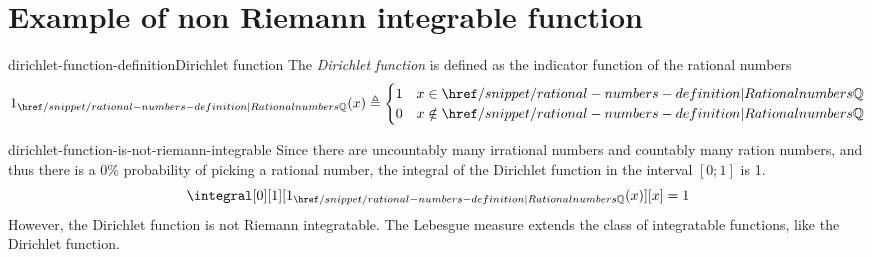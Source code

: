 \documentclass[preview]{standalone}
\begin{document}
\genpage


\section{Example of non Riemann integrable function}

\begin{snippetdefinition}{dirichlet-function-definition}{Dirichlet function}
    The \textit{Dirichlet function} is defined as the indicator function of the rational numbers
    \[
        1_{\rationalnumbers}(x) \triangleq \begin{cases}
            1 & x \in \rationalnumbers \\
            0 & x \notin \rationalnumbers
        \end{cases}
    \]
\end{snippetdefinition}

\begin{snippet}{dirichlet-function-is-not-riemann-integrable}
    Since there are uncountably many irrational numbers and countably many ration numbers,
    and thus there is a 0\% probability of picking a rational number, the integral
    of the Dirichlet function in the interval \([0; 1]\) is 1.
    \[
        \integral[0][1][1_{\rationalnumbers}(x)][x] = 1
    \]
    However, the Dirichlet function is not Riemann integratable.
    The Lebesgue measure extends the class of integratable functions, like the Dirichlet function.
\end{snippet}
\end{document}
